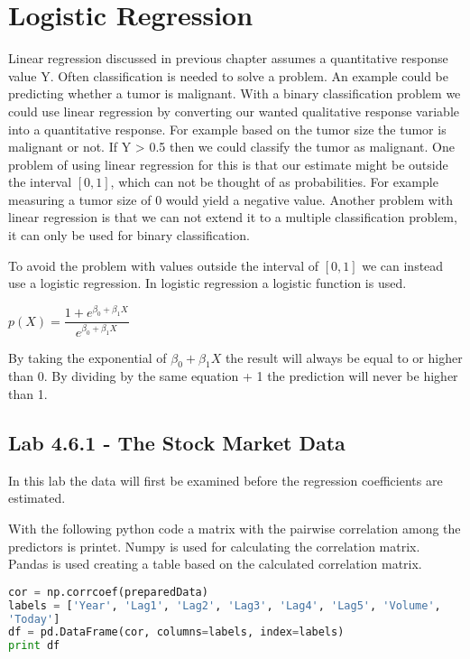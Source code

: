 \chapter{Logistic Regression}
\label{chp:logreg}
Linear regression discussed in previous chapter assumes a quantitative response value Y. Often classification is needed to solve a problem. An example could be predicting whether a tumor is malignant. With a binary classification problem we could use linear regression by converting our wanted qualitative response variable into a quantitative response. For example based on the tumor size the tumor is malignant or not. If Y > 0.5 then we could classify the tumor as malignant. One problem of using linear regression for this is that our estimate might be outside the interval $[0,1]$, which can not be thought of as probabilities. For example measuring a tumor size of 0 would yield a negative value. Another problem with linear regression is that we can not extend it to a multiple classification problem, it can only be used for binary classification.

To avoid the problem with values outside the interval of $[0,1]$ we can instead use a logistic regression. In logistic regression a logistic function is used.

\begin{center}
	$p(X) = \dfrac{1+e^{\beta_0+ \beta_1 X}}{e^{\beta_0 + \beta_1 X}}$ 
\end{center}

By taking the exponential of $\beta_0 + \beta_1 X$ the result will always be equal to or higher than 0. By dividing by the same equation + 1 the prediction will never be higher than 1.

\section{Lab 4.6.1 - The Stock Market Data}
In this lab the data will first be examined before the regression coefficients are estimated. 

With the following python code a matrix with the pairwise correlation among the predictors is printet. Numpy is used for calculating the correlation matrix. Pandas is used creating a table based on the calculated correlation matrix.
\begin{lstlisting}[language=Python, caption=print correlation matrix]
cor = np.corrcoef(preparedData)
labels = ['Year', 'Lag1', 'Lag2', 'Lag3', 'Lag4', 'Lag5', 'Volume', 
'Today']
df = pd.DataFrame(cor, columns=labels, index=labels)
print df
\end{lstlisting}

